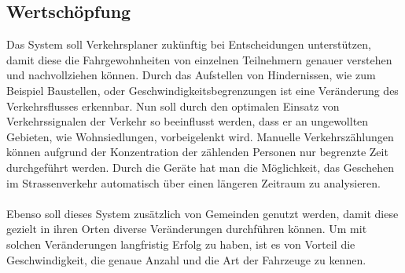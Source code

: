 \subsection{Wertschöpfung}
Das System soll Verkehrsplaner zukünftig bei Entscheidungen unterstützen, damit diese die Fahrgewohnheiten von einzelnen Teilnehmern genauer verstehen und nachvollziehen können. Durch das Aufstellen von Hindernissen, wie zum Beispiel Baustellen, oder Geschwindigkeitsbegrenzungen ist eine Veränderung des Verkehrsflusses erkennbar. Nun soll durch den optimalen Einsatz von Verkehrssignalen der Verkehr so beeinflusst werden, dass er an ungewollten Gebieten, wie Wohnsiedlungen, vorbeigelenkt wird. Manuelle Verkehrszählungen können aufgrund der Konzentration der zählenden Personen nur begrenzte Zeit durchgeführt werden. Durch die Geräte hat man die Möglichkeit, das Geschehen im Strassenverkehr automatisch über einen längeren Zeitraum zu analysieren.\\\\
Ebenso soll dieses System zusätzlich von Gemeinden genutzt werden, damit diese gezielt in ihren Orten diverse Veränderungen durchführen können. Um mit solchen Veränderungen langfristig Erfolg zu haben, ist es von Vorteil die Geschwindigkeit, die genaue Anzahl und die Art der Fahrzeuge zu kennen.